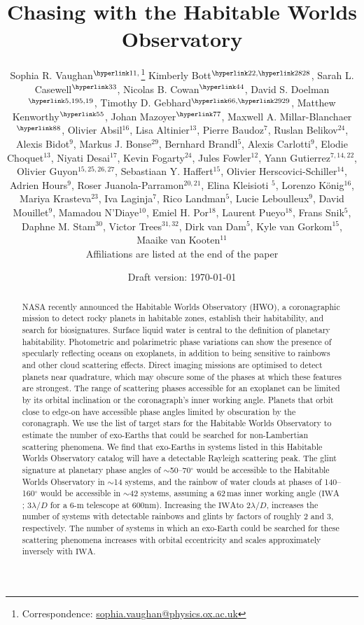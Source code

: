 \documentclass[
    usenatbib,
]{mnras}
\title{Chasing \rainbows{} with the Habitable Worlds Observatory}
\author[Sophia R. Vaughan et al.]{%
    Sophia R. Vaughan$^{\affiliationlink{1},}$\thanks{Correspondence:  \url{sophia.vaughan@physics.ox.ac.uk}}
    Kimberly Bott$^{\affiliationlink{2},\affiliationlink{28}}$,
    Sarah L. Casewell$^{\affiliationlink{3}}$,
    Nicolas B. Cowan$^{\affiliationlink{4}}$,
    David S. Doelman$^{\affiliationlink{5,19}}$,
    \newauthor 
    Timothy D. Gebhard$^{\affiliationlink{6},\affiliationlink{29}}$,
    Matthew Kenworthy$^{\affiliationlink{5}}$,
    Johan Mazoyer$^{\affiliationlink{7}}$,
    Maxwell A. Millar-Blanchaer$^{\affiliationlink{8}}$,
    \newauthor 
    Olivier Absil$^{16}$,
    Lisa Altinier$^{13}$,
    Pierre Baudoz$^{7}$,
    Ruslan Belikov$^{24}$,
    Alexis Bidot$^{9}$,
    Markus J. Bonse$^{29}$,
    \newauthor 
    Bernhard Brandl$^{5}$,
    Alexis Carlotti$^{9}$,
    Elodie Choquet$^{13}$,
    Niyati Desai$^{17}$,
    Kevin Fogarty$^{24}$,
    Jules Fowler$^{12}$,
    \newauthor
    Yann Gutierrez$^{7,14,22}$,
    Olivier Guyon$^{15,25,26,27}$,
    Sebastiaan Y. Haffert$^{15}$,
    Olivier Herscovici-Schiller$^{14}$, 
    \newauthor
    Adrien Hours$^{9}$,
    Roser Juanola-Parramon$^{20,21}$,
    Elina Kleisioti $^{5}$,
    Lorenzo König$^{16}$,
    Mariya Krasteva$^{23}$, 
    \newauthor
    Iva Laginja$^{7}$,
    Rico Landman$^{5}$,
    Lucie Leboulleux$^{9}$,
    David Mouillet$^{9}$,
    Mamadou N’Diaye$^{10}$,
    Emiel H. Por$^{18}$,
    \newauthor
    Laurent Pueyo$^{18}$,
    Frans Snik$^{5}$,
    Daphne M. Stam$^{30}$,
    Victor Trees$^{31,32}$,
    Dirk van Dam$^{5}$,
    Kyle van Gorkom$^{15}$,
    \newauthor
    Maaike van Kooten$^{11}$ 
    \newauthor \\%
    Affiliations are listed at the end of the paper
}
\date{Draft version: \today}
\newcommand{\IWA}{\ensuremath{\mathrm{IWA}}}
\begin{document}
 

\maketitle

\begin{abstract}
NASA recently announced the Habitable Worlds Observatory (HWO), a coronagraphic mission to detect rocky planets in habitable zones, establish their habitability, and search for biosignatures. 
Surface liquid water is central to the definition of planetary habitability.
%
Photometric and polarimetric phase variations can show the presence of specularly reflecting oceans on exoplanets, in addition to being sensitive to rainbows and other cloud scattering effects. 
%
Direct imaging missions are optimised to detect planets near quadrature, which may obscure some of the phases at which these features are strongest. 
%
The range of scattering phases accessible for an exoplanet can be limited by its orbital inclination or the coronagraph's inner working angle. 
%
Planets that orbit close to edge-on have accessible phase angles limited by obscuration by the coronagraph. 
%
We use the list of target stars for the Habitable Worlds Observatory to estimate the number of exo-Earths that could be searched for non-Lambertian scattering phenomena. 
%
We find that exo-Earths in systems listed in this Habitable Worlds Observatory catalog will have a detectable Rayleigh scattering peak. 
%
The glint signature at planetary phase angles of 
$\sim$50--70$^\circ$ 
would be accessible to the Habitable Worlds Observatory in $\sim$14 systems, and the rainbow of water clouds at phases of 140--160$^\circ$ would be accessible in $\sim$42 systems, assuming a 62\,mas inner working angle (\IWA; 3$\lambda/D$ for a 6-m telescope at 600nm).
%
Increasing the \IWA to 2$\lambda/D$, increases the number of systems with detectable rainbows and glints by factors of roughly 2 and 3, respectively.
%
The number of systems in which an exo-Earth could be searched for these scattering phenomena increases with orbital eccentricity and scales approximately inversely with \IWA{}.    \end{abstract}
\end{document}
